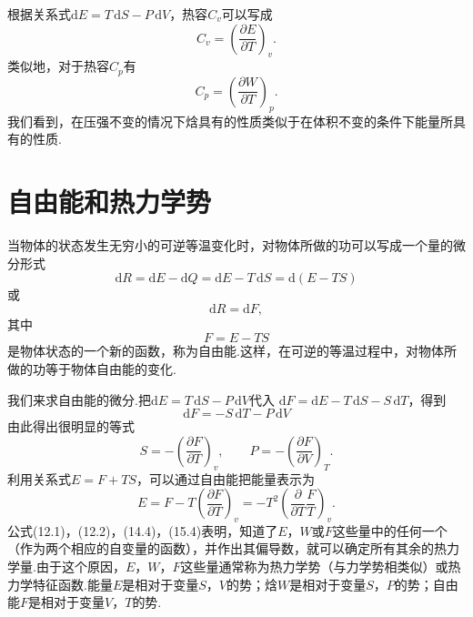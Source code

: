 根据关系式$\mathrm{d}E=T\,\mathrm{d}S-P\,\mathrm{d}V$，热容$C_v$可以写成
\begin{equation}
  C_v=\left(\frac{\partial E}{\partial T}\right)_v.
\end{equation}
类似地，对于热容$C_p$有
\begin{equation}
  C_p=\left(\frac{\partial W}{\partial T}\right)_p.
\end{equation}
我们看到，在压强不变的情况下焓具有的性质类似于在体积不变的条件下能量所具有的性质.

\section{自由能和热力学势}

当物体的状态发生无穷小的可逆等温变化时，对物体所做的功可以写成一个量的微分形式
\begin{equation*}
  \mathrm{d}R=\mathrm{d}E-\mathrm{d}Q
  =\mathrm{d}E-T\,\mathrm{d}S=\mathrm{d}(E-TS)
\end{equation*}
或
\begin{equation}
  \mathrm{d}R=\mathrm{d}F,
\end{equation}
其中
\begin{equation}
  F=E-TS
\end{equation}
是物体状态的一个新的函数，称为自由能.这样，在可逆的等温过程中，对物体所做的功等于物体自由能的变化.

我们来求自由能的微分.把$\mathrm{d}E=T\,\mathrm{d}S-P\,\mathrm{d}V$代入
$\mathrm{d}F=\mathrm{d}E-T\,\mathrm{d}S-S\,\mathrm{d}T$，得到
\begin{equation}
  \mathrm{d}F=-S\,\mathrm{d}T-P\,\mathrm{d}V
\end{equation}
由此得出很明显的等式
\begin{equation}
  S=-\left(\frac{\partial F}{\partial T}\right)_v,\qquad
  P=-\left(\frac{\partial F}{\partial V}\right)_T.
\end{equation}
利用关系式$E=F+TS$，可以通过自由能把能量表示为
\begin{equation}
  E=F-T\left(\frac{\partial F}{\partial T}\right)_v
  =-T^2\left(\frac{\partial}{\partial T}\frac{F}{T}\right)_v.
\end{equation}
公式(12.1)，(12.2)，(14.4)，(15.4)表明，知道了$E$，$W$或$F$这些量中的任何一个（作为两个相应的自变量的函数），并作出其偏导数，就可以确定所有其余的热力学量.由于这个原因，$E$，$W$，$F$这些量通常称为热力学势（与力学势相类似）或热力学特征函数.能量$E$是相对于变量$S$，$V$的势；焓$W$是相对于变量$S$，$P$的势；自由能$F$是相对于变量$V$，$T$的势.

